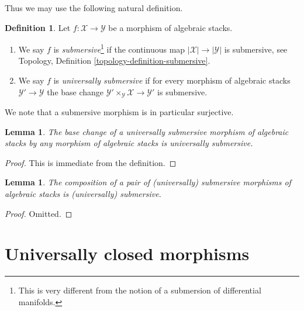 \documentclass{stacks-project}
\theoremstyle{plain}
\newtheorem{lemma}[subsection]{Lemma}
\theoremstyle{definition}
\newtheorem{definition}[subsection]{Definition}
\theoremstyle{remark}
\numberwithin{equation}{subsection}
\begin{document}
\noindent
Thus we may use the following natural definition.

\begin{definition}
\label{definition-submersive}
Let $f : \mathcal{X} \to \mathcal{Y}$ be a morphism of algebraic stacks.
\begin{enumerate}
\item We say $f$ is {\it submersive}\footnote{This is very different
from the notion of a submersion of differential manifolds.}
if the continuous map $|\mathcal{X}| \to |\mathcal{Y}|$ is submersive, see
Topology, Definition \ref{topology-definition-submersive}.
\item We say $f$ is {\it universally submersive} if for every
morphism of algebraic stacks $\mathcal{Y}' \to \mathcal{Y}$
the base change $\mathcal{Y}' \times_\mathcal{Y} \mathcal{X} \to \mathcal{Y}'$
is submersive.
\end{enumerate}
\end{definition}

\noindent
We note that a submersive morphism is in particular surjective.

\begin{lemma}
\label{lemma-base-change-universally-submersive}
The base change of a universally submersive morphism of algebraic stacks
by any morphism of algebraic stacks is universally submersive.
\end{lemma}

\begin{proof}
This is immediate from the definition.
\end{proof}

\begin{lemma}
\label{lemma-composition-universally-submersive}
The composition of a pair of (universally) submersive morphisms of
algebraic stacks is (universally) submersive.
\end{lemma}

\begin{proof}
Omitted.
\end{proof}












\section{Universally closed morphisms}
\label{section-universally-closed}
\end{document}
